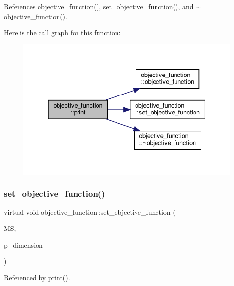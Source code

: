 References objective\+\_\+function(), set\+\_\+objective\+\_\+function(), and $\sim$objective\+\_\+function().

Here is the call graph for this function\+:
\nopagebreak
\begin{figure}[H]
\begin{center}
\leavevmode
\includegraphics[width=331pt]{d0/da1/classobjective__function_ab9fc88580b8980fd0c34e17e96a7e308_cgraph}
\end{center}
\end{figure}
\mbox{\label{classobjective__function_acdfb59b7a754ee183250696c6c55b5ae}} 
\subsubsection{\texorpdfstring{set\+\_\+objective\+\_\+function()}{set\_objective\_function()}}
{\footnotesize\ttfamily virtual void objective\+\_\+function\+::set\+\_\+objective\+\_\+function (\begin{DoxyParamCaption}\item[{meilp\+\_\+solver\+Ref const \&}]{MS,  }\item[{\hyperlink{problem__dim_8hpp_a812f38fcffc2dd233a75bda8126c9dba}{problem\+\_\+dim\+Ref} const \&}]{p\+\_\+dimension }\end{DoxyParamCaption})\hspace{0.3cm}{\ttfamily [pure virtual]}}



Referenced by print().

